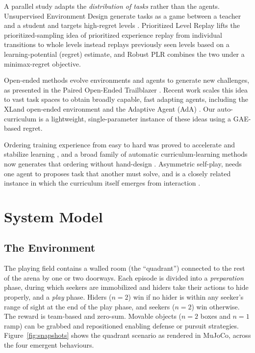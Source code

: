 \documentclass{article}
\begin{document}
A parallel study adapts the \emph{distribution of tasks} rather than the
agents. Unsupervised Environment Design generate tasks as a game between a
teacher and a student and targets high-regret levels
\citep{dennis2020paired}. Prioritized Level Replay \citep{jiang2021plr} lifts
the prioritized-sampling idea of prioritized experience replay
\citep{schaul2016prioritized} from individual transitions to whole levels instead
replays previously seen levels based on a learning-potential (regret)
estimate, and Robust PLR \citep{jiang2021robust} combines the two under a
minimax-regret objective. 

Open-ended methods evolve environments and agents to generate new
challenges, as presented in the Paired Open-Ended Trailblazer \citep{wang2019poet}. Recent
work scales this idea to vast task spaces to obtain broadly capable, fast adapting
agents, including the XLand open-ended environment \citep{openended2021} and the
Adaptive Agent (AdA) \citep{ada2023}. Our auto-curriculum is a lightweight, single-parameter
instance of these ideas using a GAE-based regret.

Ordering training experience from easy to hard was proved to accelerate and
stabilize learning \citep{bengio2009curriculum}, and a broad family of
automatic curriculum-learning methods now generates that ordering without
hand-design \citep{portelas2020automatic}. Asymmetric self-play, needs one
agent to proposes task that another must solve, and is a closely related instance in
which the curriculum itself emerges from interaction
\citep{sukhbaatar2018asymmetric}.


\section{System Model}
\label{sec:system}

\subsection{The Environment}
\label{sec:env}

The playing field contains a walled room (the
``quadrant'') connected to the rest of the arena by one or two doorways. Each
episode is divided into a \emph{preparation} phase, during which seekers are
immobilized and hiders take their actions to hide properly, and a \emph{play} phase. Hiders (\(n=2\)) win if no hider is within
any seeker's range of sight at the end of the play phase, and seekers (\(n=2\)) win
otherwise. The reward is team-based and zero-sum. Movable objects
(\(n=2\) boxes and \(n=1\) ramp) can be grabbed and repositioned enabling defense or pursuit strategies. Figure~\ref{fig:snapshots} shows the quadrant scenario as rendered in MuJoCo, across the four emergent behaviours.
\end{document}
